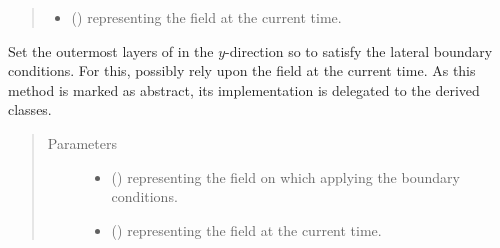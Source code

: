 \documentclass[letterpaper,10pt,english]{sphinxmanual}
\begin{document}
\begin{fulllineitems}
\begin{fulllineitems}
\begin{quote}
\begin{description}
\begin{itemize}
\item {} 
 () \textendash{}  representing the field at the current time.

\end{itemize}

\end{description}\end{quote}

\end{fulllineitems}


\begin{fulllineitems}
\label{\detokenize{api:dycore.horizontal_boundary.HorizontalBoundary.set_outermost_layers_y}}
Set the outermost layers of  in the \(y\)-direction so to satisfy
the lateral boundary conditions. For this, possibly rely upon the field  at the current time.
As this method is marked as abstract, its implementation is delegated to the derived classes.
\begin{quote}\begin{description}
\item[{Parameters}] \leavevmode\begin{itemize}
\item {} 
 () \textendash{}  representing the field on which applying the boundary conditions.

\item {} 
 () \textendash{}  representing the field at the current time.

\end{itemize}

\end{description}\end{quote}

\end{fulllineitems}


\end{fulllineitems}
\end{document}
